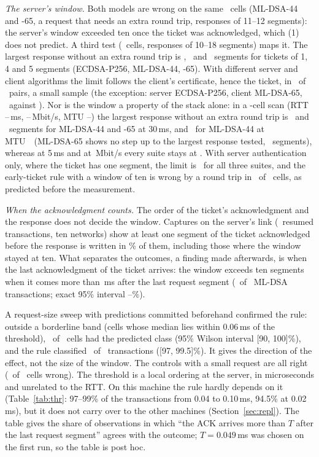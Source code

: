 \documentclass[sigconf,9pt,nonacm]{acmart}
\newcommand{\ms}{\,ms\xspace}
\begin{document}
\emph{The server's window.} Both models are wrong on the same \DBothWrong\ cells (ML-DSA-44 and -65, a request that needs an extra round trip, responses of 11--12 segments): the server's window exceeded ten once the ticket was acknowledged, which (1) does not predict. A third test (\EN\ cells, responses of 10--18 segments) maps it. The largest response without an extra round trip is \EFitEcdsa, \EFitMlFourFour\ and \EFitMlSixFive\ segments for tickets of 1, 4 and 5 segments (ECDSA-P256, ML-DSA-44, -65). With different server and client algorithms the limit follows the client's certificate, hence the ticket, in \MixRight\ of \MixN\ pairs, a small sample (the exception: server ECDSA-P256, client ML-DSA-65, \MixFitExc\ against \MixPredExc). Nor is the window a property of the stack alone: in a \GenCells-cell scan (RTT \GenRttLo--\GenRttHi\ms, \GenRateLo--\GenRateHi\,Mbit/s, MTU \GenMtuLo--\GenMtuHi) the largest response without an extra round trip is \GenWMFourFourRttThirty\ and \GenWMSixFiveRttThirty\ segments for ML-DSA-44 and -65 at 30\ms, and \GenWMFourFourMtuLow\ for ML-DSA-44 at MTU~\GenMtuLo\ (ML-DSA-65 shows no step up to the largest response tested, \GenRespMax\ segments), whereas at 5\ms and at \GenRateLo\,Mbit/s every suite stays at \GenWEcRttFive. With server authentication only, where the ticket has one segment, the limit is \ServWindow\ for all three suites, and the early-ticket rule with a window of ten is wrong by a round trip in \ServWrong\ of \ServCells\ cells, as predicted before the measurement.

\emph{When the acknowledgment counts.} The order of the ticket's acknowledgment and the response does not decide the window. Captures on the server's link (\RaceN\ resumed transactions, ten networks) show at least one segment of the ticket acknowledged before the response is written in \RaceBeforePct\% of them, including those where the window stayed at ten. What separates the outcomes, a finding made afterwards, is when the last acknowledgment of the ticket arrives: the window exceeds ten segments when it comes more than \RaceThr\ms after the last request segment (\RaceRight\ of \RaceMlN\ ML-DSA transactions; exact 95\% interval \CiRaceLo--\CiRaceHi\%).

A request-size sweep with predictions committed beforehand confirmed the rule: outside a borderline band (cells whose median lies within 0.06\ms of the threshold), \RaceTwoRight\ of \RaceTwoScored\ cells had the predicted class (95\% Wilson interval [90, 100]\%), and the rule classified \RaceTwoOosRight\ of \RaceTwoOosN\ transactions ([97, 99.5]\%). It gives the direction of the effect, not the size of the window. The controls with a small request are all right (\ECtlWrong\ of \ECtlN\ cells wrong). The threshold is a local ordering at the server, in microseconds and unrelated to the RTT. On this machine the rule hardly depends on it (Table~\ref{tab:thr}: 97--99\% of the transactions from 0.04 to 0.10\ms, 94.5\% at 0.02\ms), but it does not carry over to the other machines (Section~\ref{sec:repl}). The table gives the share of observations in which ``the ACK arrives more than $T$ after the last request segment'' agrees with the outcome; $T=0.049$\ms was chosen on the first run, so the table is post hoc.
\end{document}
